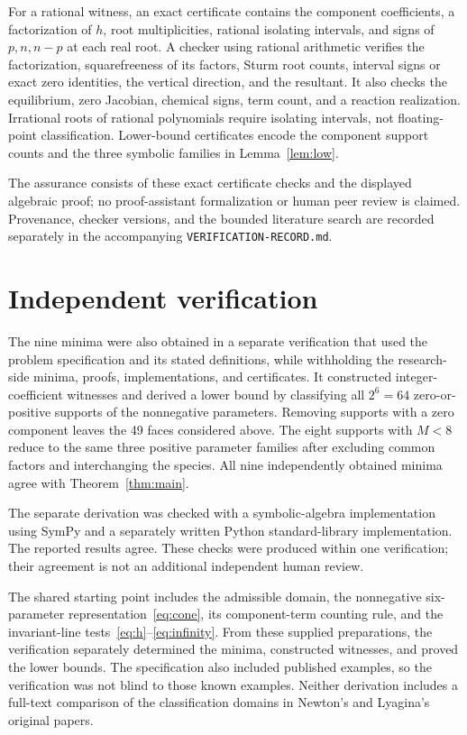 \documentclass[11pt,a4paper]{article}
\theoremstyle{definition}\newtheorem{definition}[theorem]{Definition}
\begin{document}
For a rational witness, an exact certificate contains the component
coefficients, a factorization of $h$, root multiplicities, rational isolating
intervals, and signs of $p,n,n-p$ at each real root. A checker using rational
arithmetic verifies the factorization, squarefreeness of its factors,
Sturm root counts, interval signs or exact zero identities, the vertical
direction, and the resultant. It also checks the equilibrium, zero Jacobian,
chemical signs, term count, and a reaction realization. Irrational roots of
rational polynomials require isolating intervals, not floating-point
classification. Lower-bound certificates encode the component support
counts and the three symbolic families in Lemma~\ref{lem:low}.

The assurance consists of these exact certificate checks and the displayed
algebraic proof; no proof-assistant formalization or human peer
review is claimed. Provenance, checker versions, and the bounded literature
search are recorded separately in the accompanying
\texttt{VERIFICATION-RECORD.md}.

\section{Independent verification}
The nine minima were also obtained in a separate verification that used the
problem specification and its stated definitions, while withholding the
research-side minima, proofs, implementations, and certificates. It constructed
integer-coefficient witnesses and derived a lower bound by classifying all
$2^6=64$ zero-or-positive supports of the nonnegative parameters. Removing
supports with a zero component leaves the 49 faces considered above. The eight
supports with $M<8$ reduce to the same three positive parameter families after
excluding common factors and interchanging the species. All nine independently
obtained minima agree with Theorem~\ref{thm:main}.

The separate derivation was checked with a symbolic-algebra implementation
using SymPy and a separately written Python standard-library implementation.
The reported results agree. These checks were produced within one verification;
their agreement is not an additional independent human review.

The shared starting point includes the admissible domain, the nonnegative
six-parameter representation~\eqref{eq:cone}, its component-term counting rule,
and the invariant-line tests~\eqref{eq:h}--\eqref{eq:infinity}. From these
supplied preparations, the verification separately determined the minima,
constructed witnesses, and proved the lower bounds. The specification also
included published examples, so the verification was not blind to those known
examples. Neither derivation includes a full-text comparison of the
classification domains in Newton's and Lyagina's original papers.
\end{document}
